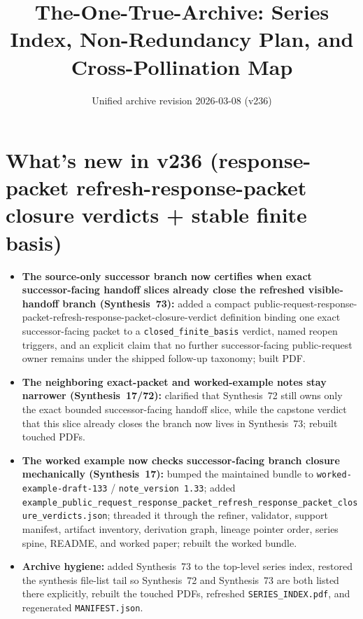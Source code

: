 \documentclass[11pt]{article}
\title{The-One-True-Archive: Series Index, Non-Redundancy Plan, and Cross-Pollination Map}
\author{}
\date{Unified archive revision 2026-03-08 (v236)}
\begin{document}
\maketitle


\section{What's new in v236 (response-packet refresh-response-packet closure verdicts + stable finite basis)}
\begin{itemize}[leftmargin=*]
\item \textbf{The source-only successor branch now certifies when exact successor-facing handoff slices already close the refreshed visible-handoff branch (Synthesis~73):} added a compact public-request-response-packet-refresh-response-packet-closure-verdict definition binding one exact successor-facing packet to a \texttt{closed\_finite\_basis} verdict, named reopen triggers, and an explicit claim that no further successor-facing public-request owner remains under the shipped follow-up taxonomy; built PDF.
\item \textbf{The neighboring exact-packet and worked-example notes stay narrower (Synthesis~17/72):} clarified that Synthesis~72 still owns only the exact bounded successor-facing handoff slice, while the capstone verdict that this slice already closes the branch now lives in Synthesis~73; rebuilt touched PDFs.
\item \textbf{The worked example now checks successor-facing branch closure mechanically (Synthesis~17):} bumped the maintained bundle to \texttt{worked-example-draft-133} / \texttt{note\_version 1.33}; added \texttt{example\_public\_request\_response\_packet\_refresh\_response\_packet\_closure\_verdicts.json}; threaded it through the refiner, validator, support manifest, artifact inventory, derivation graph, lineage pointer order, series spine, README, and worked paper; rebuilt the worked bundle.
\item \textbf{Archive hygiene:} added Synthesis~73 to the top-level series index, restored the synthesis file-list tail so Synthesis~72 and Synthesis~73 are both listed there explicitly, rebuilt the touched PDFs, refreshed \texttt{SERIES\_INDEX.pdf}, and regenerated \texttt{MANIFEST.json}.
\end{itemize}
\end{document}
